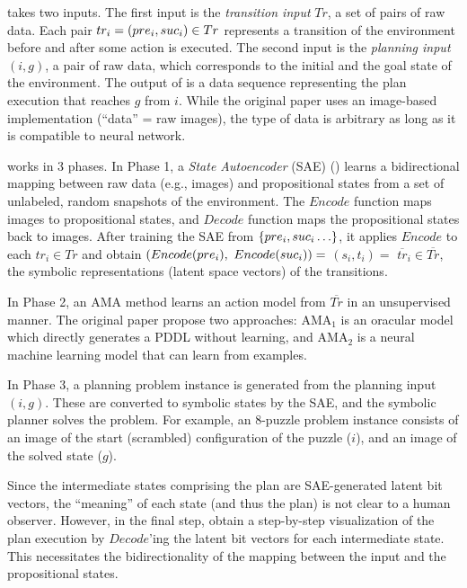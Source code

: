 \latentplanner takes two inputs.
The first input is the \emph{transition input} $Tr$, a set of pairs of raw data.
Each pair $tr_i=(pre_i, suc_i) \in Tr$ represents a transition of the environment before and after some action is executed.
The second input is the \emph{planning input} $(i, g)$, a pair of raw data, which corresponds to the initial and the goal state of the environment.
The output of \latentplanner is a data sequence representing the plan execution that reaches $g$ from $i$.
While the original paper uses an image-based implementation (``data'' = raw images),
the type of data is arbitrary as long as it is compatible to neural network.


\latentplanner works in 3 phases.
In Phase 1, a \emph{State Autoencoder} (SAE) () learns a bidirectional mapping between raw data (e.g., images)
 and propositional states from a set of unlabeled, random snapshots of the environment.
The $Encode$ function maps images to propositional states, and $Decode$ function maps the propositional states back to images.
After training the SAE from ${\left\{pre_i, suc_i\ldots\right\}}$,
it applies $Encode$ to each $tr_i \in Tr$ and obtain $(Encode(pre_i),$ $Encode(suc_i))=$ $(s_i,t_i)=$ $\overline{tr}_i\in \overline{Tr}$,
the symbolic representations (latent space vectors) of the transitions.

In Phase 2, an AMA method learns an action model from $\overline{Tr}$ in an unsupervised manner.
The original paper propose two approaches: AMA$_1$ is an oracular model which directly generates a PDDL without learning,
and AMA$_2$ is a neural machine learning model that can learn from examples.

In Phase 3, a planning problem instance is generated from the planning input $(i,g)$.
These are converted to symbolic states by the SAE, and the symbolic planner solves the problem.
For example, an 8-puzzle problem instance consists of an image of the start (scrambled) configuration of the puzzle ($i$), and an image of the solved state ($g$).

Since the intermediate states comprising the plan are SAE-generated latent bit vectors, the ``meaning'' of each state (and thus the plan) is not clear to a human observer.
However, in the final step, \latentplanner obtain a step-by-step visualization of the plan execution
by $Decode$'ing the latent bit vectors for each intermediate state.
This necessitates the bidirectionality of the mapping between the input and the propositional states.

